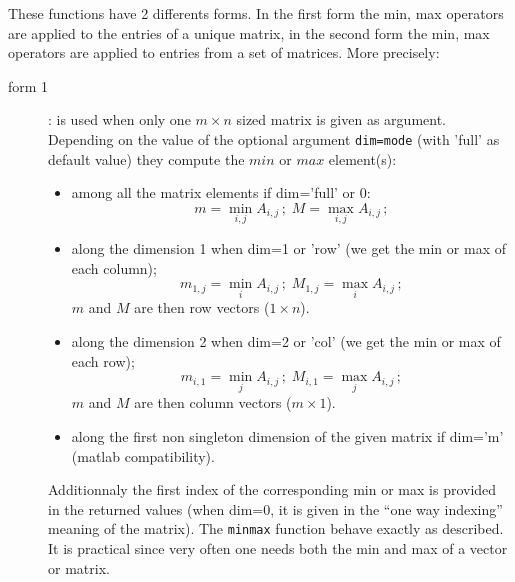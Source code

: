 \begin{mandescription}
These functions have 2 differents forms. In the first form the min, max operators are 
applied to the entries of a unique matrix, in the second form the  min, max operators are 
applied to entries from a set of matrices. More precisely:
\begin{description}
\item[form 1]: is used when only one $m \times n$ sized matrix is given as argument. Depending on the value of the 
           optional argument \verb+dim=mode+ (with 'full' as default value) they compute the $min$ or $max$ element(s):
  \begin{itemize}
    \item among all the matrix elements if dim='full' or 0:
     $$
           m = \min_{i,j} A_{i,j}\,; \; M = \max_{i,j} A_{i,j}\, ;
     $$
    \item along the dimension 1 when dim=1 or 'row' (we get the min or max of each column);
     $$
           m_{1,j} = \min_i A_{i,j}\,; \; M_{1,j} = \max_i A_{i,j}\, ;
     $$
     $m$ and $M$ are then row vectors ($1 \times n$).
    \item along the dimension 2 when dim=2 or 'col' (we get the min or max of each row);
     $$
           m_{i,1} = \min_j A_{i,j}\,; \; M_{i,1} = \max_j A_{i,j}\,; 
     $$
     $m$ and $M$ are then column vectors ($m \times 1$).
    \item along the first non singleton dimension of the given matrix if dim='m' (matlab compatibility).
  \end{itemize}

Additionnaly the first index of the corresponding min or max is provided in the returned values (when dim=0, it is 
given in the ``one way indexing'' meaning of the matrix). The \verb+minmax+ function behave exactly
as described. It is practical since very often one needs both the min and max of a vector or matrix.  


\end{description}
\end{mandescription}
